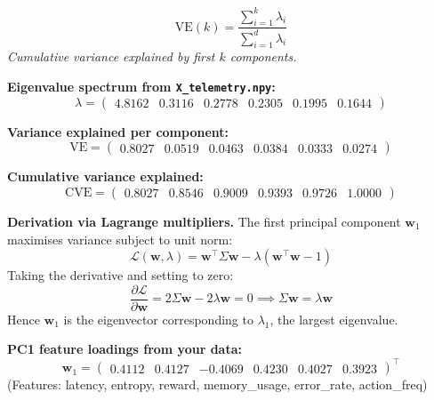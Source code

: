 \documentclass[12pt]{article}
\begin{document}
\begin{equation}
\mathrm{VE}(k) = \frac{\sum_{i=1}^{k}\lambda_i}{\sum_{i=1}^{d}\lambda_i}
\end{equation}
\noindent\textit{Cumulative variance explained by first $k$ components.}


\noindent\textbf{Eigenvalue spectrum from \texttt{X\_telemetry.npy}:}
\begin{equation}
\lambda = \begin{pmatrix}4.8162 & 0.3116 & 0.2778 & 0.2305 & 0.1995 & 0.1644\end{pmatrix}
\end{equation}

\noindent\textbf{Variance explained per component:}
\begin{equation}
\mathrm{VE} = \begin{pmatrix}0.8027 & 0.0519 & 0.0463 & 0.0384 & 0.0333 & 0.0274\end{pmatrix}
\end{equation}

\noindent\textbf{Cumulative variance explained:}
\begin{equation}
\mathrm{CVE} = \begin{pmatrix}0.8027 & 0.8546 & 0.9009 & 0.9393 & 0.9726 & 1.0000\end{pmatrix}
\end{equation}



\noindent\textbf{Derivation via Lagrange multipliers.}
The first principal component $\mathbf{w}_1$ maximises variance
subject to unit norm:
\begin{equation}
\mathcal{L}(\mathbf{w}, \lambda) =
\mathbf{w}^\top \Sigma \mathbf{w}
- \lambda(\mathbf{w}^\top\mathbf{w} - 1)
\end{equation}
Taking the derivative and setting to zero:
\begin{equation}
\frac{\partial \mathcal{L}}{\partial \mathbf{w}}
= 2\Sigma\mathbf{w} - 2\lambda\mathbf{w} = 0
\implies \Sigma\mathbf{w} = \lambda\mathbf{w}
\end{equation}
Hence $\mathbf{w}_1$ is the eigenvector corresponding to
$\lambda_1$, the largest eigenvalue.


\noindent\textbf{PC1 feature loadings from your data:}
\begin{equation}
\mathbf{w}_1 = \begin{pmatrix}0.4112 & 0.4127 & -0.4069 & 0.4230 & 0.4027 & 0.3923\end{pmatrix}^\top
\end{equation}
(Features: latency, entropy, reward, memory\_usage, error\_rate, action\_freq)
\end{document}
